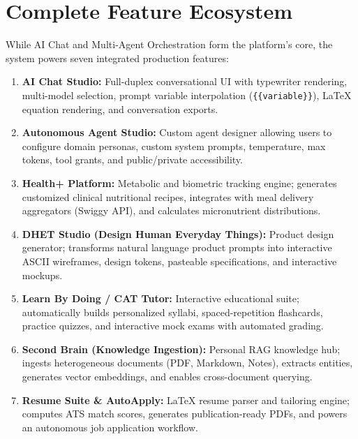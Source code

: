 \documentclass[10pt,a4paper]{article}
\begin{document}
\section{Complete Feature Ecosystem}

\noindent While AI Chat and Multi-Agent Orchestration form the platform's core, the system powers seven integrated production features:

\begin{enumerate}[leftmargin=*]
    \item \textbf{AI Chat Studio:} Full-duplex conversational UI with typewriter rendering, multi-model selection, prompt variable interpolation (\texttt{\{\{variable\}\}}), LaTeX equation rendering, and conversation exports.
    \item \textbf{Autonomous Agent Studio:} Custom agent designer allowing users to configure domain personas, custom system prompts, temperature, max tokens, tool grants, and public/private accessibility.
    \item \textbf{Health+ Platform:} Metabolic and biometric tracking engine; generates customized clinical nutritional recipes, integrates with meal delivery aggregators (Swiggy API), and calculates micronutrient distributions.
    \item \textbf{DHET Studio (Design Human Everyday Things):} Product design generator; transforms natural language product prompts into interactive ASCII wireframes, design tokens, pasteable specifications, and interactive mockups.
    \item \textbf{Learn By Doing / CAT Tutor:} Interactive educational suite; automatically builds personalized syllabi, spaced-repetition flashcards, practice quizzes, and interactive mock exams with automated grading.
    \item \textbf{Second Brain (Knowledge Ingestion):} Personal RAG knowledge hub; ingests heterogeneous documents (PDF, Markdown, Notes), extracts entities, generates vector embeddings, and enables cross-document querying.
    \item \textbf{Resume Suite \& AutoApply:} LaTeX resume parser and tailoring engine; computes ATS match scores, generates publication-ready PDFs, and powers an autonomous job application workflow.
\end{enumerate}

\end{document}
